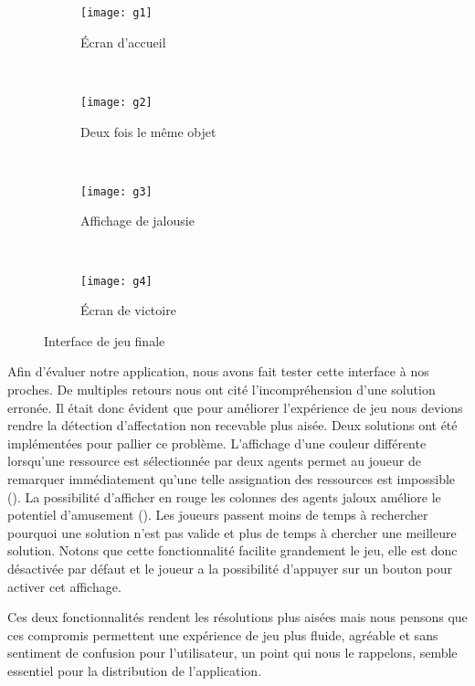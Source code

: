 \documentclass[../main.tex]{subfiles}
\begin{document}
\begin{figure}[ht!]
    \centering
    \begin{subfigure}{0.34\textwidth}
        \centering
        \texttt{[image: g1]}
        \caption{Écran d'accueil}
        \label{fig-finalgameview}
    \end{subfigure}
    ~
    \begin{subfigure}{0.34\textwidth}
        \centering
        \texttt{[image: g2]}
        \caption{Deux fois le même objet}
        \label{fig-twotimes}
   \end{subfigure}
    ~
    \begin{subfigure}{0.34\textwidth}
        \centering
        \texttt{[image: g3]}
        \caption{Affichage de jalousie}
        \label{fig-envy}
    \end{subfigure}
    ~
    \begin{subfigure}{0.34\textwidth}
        \centering
        \texttt{[image: g4]}
        \caption{Écran de victoire}
    \end{subfigure}
    \caption{Interface de jeu finale}
\end{figure}

    Afin d'évaluer notre application, nous avons fait tester cette interface à nos proches. De multiples retours nous ont cité l'incompréhension d'une solution erronée. Il était donc évident que pour améliorer l'expérience de jeu nous devions rendre la détection d'affectation non recevable plus aisée. Deux solutions ont été implémentées pour pallier ce problème. L'affichage d'une couleur différente lorsqu'une ressource est sélectionnée par deux agents permet au joueur de remarquer immédiatement qu'une telle assignation des ressources est impossible (). La possibilité d'afficher en rouge les colonnes des agents jaloux améliore le potentiel d'amusement (). Les joueurs passent moins de temps à rechercher pourquoi une solution n'est pas valide et plus de temps à chercher une meilleure solution. Notons que cette fonctionnalité facilite grandement le jeu, elle est donc désactivée par défaut et le joueur a la possibilité d'appuyer sur un bouton pour activer cet affichage.

    Ces deux fonctionnalités rendent les résolutions plus aisées mais nous pensons que ces compromis permettent une expérience de jeu plus fluide, agréable et sans sentiment de confusion pour l'utilisateur, un point qui nous le rappelons, semble essentiel pour la distribution de l'application. 
	
\end{document}

